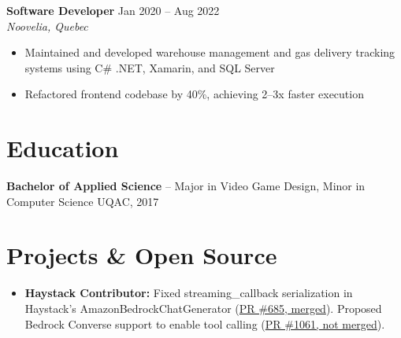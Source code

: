 ﻿\documentclass[10pt,letterpaper]{article}
\begin{document}
\vspace{2pt}
\textbf{Software Developer} \hfill Jan 2020 -- Aug 2022\\
\textit{Noovelia, Quebec}
\begin{itemize}[nosep]
\item Maintained and developed warehouse management and gas delivery tracking systems using C\# .NET, Xamarin, and SQL Server
\item Refactored frontend codebase by 40\%, achieving 2--3x faster execution
\end{itemize}

\section*{Education}
\textbf{Bachelor of Applied Science} -- Major in Video Game Design, Minor in Computer Science \hfill UQAC, 2017

\section*{Projects \& Open Source}
\begin{itemize}[nosep]
\item \textbf{Haystack Contributor:} Fixed streaming\_callback serialization in Haystack's AmazonBedrockChatGenerator (\href{https://github.com/deepset-ai/haystack-core-integrations/pull/685}{PR \#685, merged}). Proposed Bedrock Converse support to enable tool calling (\href{https://github.com/deepset-ai/haystack-core-integrations/pull/1061}{PR \#1061, not merged}).
\end{itemize}
\end{document}

